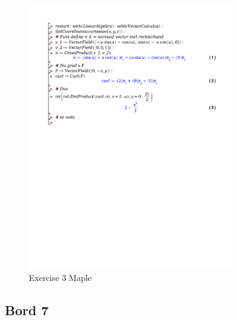 \documentclass[a4paper]{report}
\begin{document}
\begin{figure}[H]
	\centering
	\includegraphics[width=0.8\textwidth]{exercises/wc_7_ex_3.pdf}
	\caption{Exercise 3 Maple}
	\label{fig:wc_7_ex_3_maple}
\end{figure}

\subsection*{Bord 7}
\end{document}
